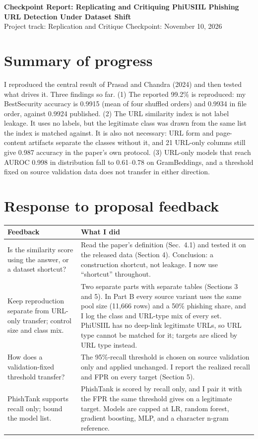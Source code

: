\documentclass[10pt]{article}
\newcommand{\tsz}{\footnotesize}
\begin{document}
\begin{center}
{\large\bfseries Checkpoint Report: Replicating and Critiquing PhiUSIIL Phishing URL Detection Under Dataset Shift}\\[2pt]
Project track: Replication and Critique \quad Checkpoint: November 10, 2026
\end{center}

\section{Summary of progress}
I reproduced the central result of Prasad and Chandra (2024) and then tested what drives it. Three findings so far.
(1) The reported 99.2\% is reproduced: my BestSecurity accuracy is 0.9915 (mean of four shuffled orders) and 0.9934 in file order, against 0.9924 published.
(2) The URL similarity index is not label leakage. It uses no labels, but the legitimate class was drawn from the same list the index is matched against. It is also not necessary: URL form and page-content artifacts separate the classes without it, and 21 URL-only columns still give 0.987 accuracy in the paper's own protocol.
(3) URL-only models that reach AUROC 0.998 in distribution fall to 0.61--0.78 on GramBeddings, and a threshold fixed on source validation data does not transfer in either direction.

\section{Response to proposal feedback}
\begin{center}
\tsz
\begin{tabular}{@{}p{2.2in}p{4.7in}@{}}
\toprule
\textbf{Feedback} & \textbf{What I did} \\
\midrule
Is the similarity score using the answer, or a dataset shortcut? &
Read the paper's definition (Sec.\ 4.1) and tested it on the released data (Section 4). Conclusion: a construction shortcut, not leakage. I now use ``shortcut'' throughout. \\
Keep reproduction separate from URL-only transfer; control size and class mix. &
Two separate parts with separate tables (Sections 3 and 5). In Part B every source variant uses the same pool size (11,666 rows) and a 50\% phishing share, and I log the class and URL-type mix of every set. PhiUSIIL has no deep-link legitimate URLs, so URL type cannot be matched for it; targets are sliced by URL type instead. \\
How does a validation-fixed threshold transfer? &
The 95\%-recall threshold is chosen on source validation only and applied unchanged. I report the realized recall and FPR on every target (Section 5). \\
PhishTank supports recall only; bound the model list. &
PhishTank is scored by recall only, and I pair it with the FPR the same threshold gives on a legitimate target. Models are capped at LR, random forest, gradient boosting, MLP, and a character n-gram reference. \\
\bottomrule
\end{tabular}
\end{center}
\end{document}
